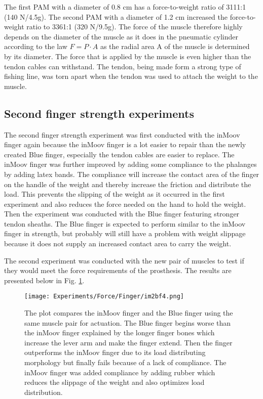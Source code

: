 \documentclass[main]{subfiles}
\begin{document}
The first PAM with a diameter of 0.8 cm has a force-to-weight ratio of 3111:1 (140 N/4.5g). The second PAM with a diameter of 1.2 cm increased the force-to-weight ratio to 3361:1 (320 N/9.5g). The force of the muscle therefore highly depends on the diameter of the muscle as it does in the pneumatic cylinder according to the law $F = P \cdot A$ as the radial area A of the muscle is determined by its diameter. The force that is applied by the muscle is even higher than the tendon cables can withstand.  The tendon, being made form a strong type of fishing line, was torn apart when the tendon was used to attach the weight to the muscle.

\subsection{Second finger strength experiments}

The second finger strength experiment was first conducted with the inMoov finger again because the inMoov finger is a lot easier to repair than the newly created Blue finger, especially the tendon cables are easier to replace. The inMoov finger was further improved by adding some compliance to the phalanges by adding latex bands. The compliance will increase the contact area of the finger on the handle of the weight and thereby increase the friction and distribute the load. This prevents the slipping of the weight as it occurred in the first experiment and also reduces the force needed on the hand to hold the weight. Then the experiment was conducted with the Blue finger featuring stronger tendon sheaths. The Blue finger is expected to perform similar to the inMoov finger in strength, but probably will still have a problem with weight slippage because it does not supply an increased contact area to carry the weight.

The second experiment was conducted with the new pair of muscles to test if they would meet the force requirements of the prosthesis. The results are presented below in Fig. \ref{im2bf4}.

\begin{figure}[htp]
\centering
\texttt{[image: Experiments/Force/Finger/im2bf4.png]}
\caption[inMoov and Blue finger force comparison]{The plot compares the inMoov finger and the Blue finger using the same muscle pair for actuation. The Blue finger begins worse than the inMoov finger explained by the longer finger bones which increase the lever arm and make the finger extend. Then the finger outperforms the inMoov finger due to its load distributing morphology but finally fails because of a lack of compliance. The inMoov finger was added compliance by adding rubber which reduces the slippage of the weight and also optimizes load distribution. }
\label{im2bf4}
\end{figure}
\end{document}

